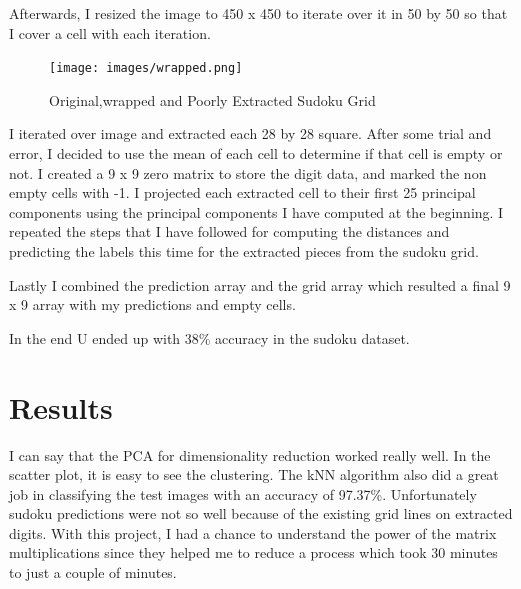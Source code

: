 Afterwards, I resized the image to 450 x 450 to iterate over it in 50 by 50 so
that I cover a cell with each iteration.

\begin{figure}[H]
    \centering
    \texttt{[image: images/wrapped.png]}
    \caption*{Original,wrapped and Poorly Extracted Sudoku Grid}
    \setlength{\belowcaptionskip}{-20pt}
    \setlength{\abovecaptionskip}{-20pt}
\end{figure}

I iterated over image and extracted each 28 by 28 square. After some trial and
error, I decided to use the mean of each cell to determine if that cell is empty
or not. I created a 9 x 9 zero matrix to store the digit data, and marked the
non empty cells with -1. I projected each extracted cell to their first 25
principal components using the principal components I have computed at the
beginning. I repeated the steps that I have followed for computing the distances
and predicting the labels this time for the extracted pieces from the sudoku
grid.

Lastly I combined the prediction array and the grid array which resulted a final
9 x 9 array with my predictions and empty cells.

In the end U ended up with 38\% accuracy in the sudoku dataset.

\section*{Results}

I can say that the PCA for dimensionality reduction worked really well. In the
scatter plot, it is easy to see the clustering. The kNN algorithm also did a
great job in classifying the test images with an accuracy of 97.37\%.
Unfortunately sudoku predictions were not so well because of the existing grid
lines on extracted digits. With this project, I had a chance to understand the
power of the matrix multiplications since they helped me to reduce a process
which took 30 minutes to just a couple of minutes.

